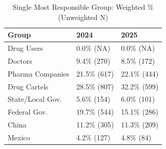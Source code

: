 \begin{table}[!h]
\centering
\caption{Single Most Responsible Group: Weighted \% (Unweighted N)}
\centering
\begin{tabular}[t]{lll}
\toprule
Group & 2024 & 2025\\
\midrule
Drug Users & 0.0\% (NA) & 0.0\% (NA)\\
Doctors & 9.4\% (270) & 8.5\% (172)\\
Pharma Companies & 21.5\% (617) & 22.1\% (444)\\
Drug Cartels & 28.5\% (807) & 32.2\% (599)\\
State/Local Gov. & 5.6\% (154) & 6.0\% (101)\\
Federal Gov. & 19.7\% (544) & 15.1\% (286)\\
China & 11.2\% (305) & 11.3\% (209)\\
Mexico & 4.2\% (127) & 4.8\% (84)\\
\bottomrule
\end{tabular}
\end{table}
